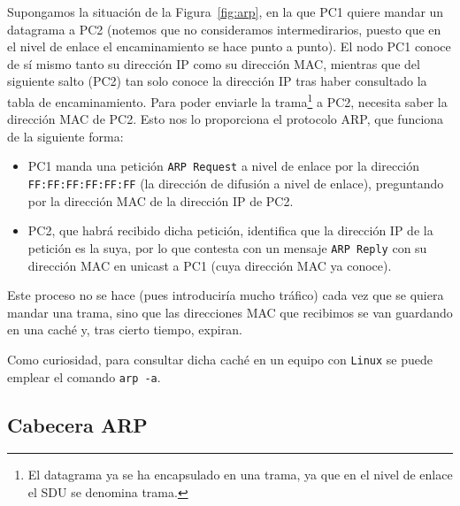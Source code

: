 Supongamos la situación de la Figura~\ref{fig:arp}, en la que PC1 quiere mandar un datagrama a PC2 (notemos que no consideramos intermedirarios, puesto que en el nivel de enlace el encaminamiento se hace punto a punto). El nodo PC1 conoce de sí mismo tanto su dirección IP como su dirección MAC\@, mientras que del siguiente salto (PC2) tan solo conoce la dirección IP tras haber consultado la tabla de encaminamiento. Para poder enviarle la trama\footnote{El datagrama ya se ha encapsulado en una trama, ya que en el nivel de enlace el \acrshort{SDU} se denomina trama.} a PC2, necesita saber la dirección MAC de PC2\@. Esto nos lo proporciona el protocolo \acrshort{ARP}, que funciona de la siguiente forma:
\begin{itemize}
    \item PC1 manda una petición \verb|ARP Request| a nivel de enlace por la dirección \verb|FF:FF:FF:FF:FF:FF| (la dirección de difusión a nivel de enlace), preguntando por la dirección MAC de la dirección IP de PC2.
    
    \item PC2, que habrá recibido dicha petición, identifica que la dirección IP de la petición es la suya, por lo que contesta con un mensaje \verb|ARP Reply| con su dirección MAC en unicast a PC1 (cuya dirección MAC ya conoce).
\end{itemize}

Este proceso no se hace (pues introduciría mucho tráfico) cada vez que se quiera mandar una trama, sino que las direcciones \acrshort{MAC} que recibimos se van guardando en una caché y, tras cierto tiempo, expiran.
\begin{observacion}
    Como curiosidad, para consultar dicha caché en un equipo con \verb|Linux| se puede emplear el comando \verb|arp -a|.
\end{observacion}

\subsection{Cabecera \acrshort{ARP}}

